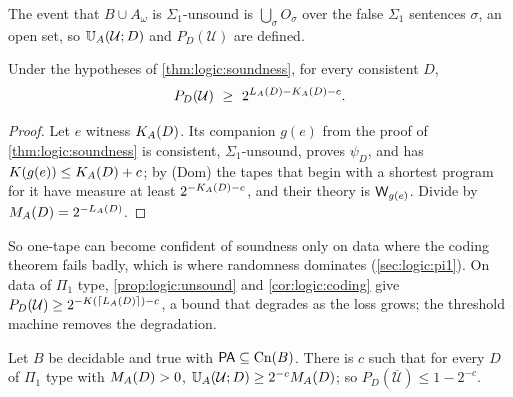 The event that $B\cup A_\omega$ is $\Sigma_1$-unsound is $\bigcup_\sigma O_\sigma$ over the false $\Sigma_1$ sentences $\sigma$, an open set, so $\mathbb{U}_{A}(\mathcal U;D)$ and $P_D(\mathcal U)$ are defined.

\begin{proposition}\label{prop:logic:unsound}
Under the hypotheses of \cref{thm:logic:soundness}, for every consistent $D$,
\[
P_D(\mathcal U)\ \ge\ 2^{\LA(D)-\KA(D)-c}.
\]
\end{proposition}

\begin{proof}
Let $e$ witness $K_{A}(D)$. Its companion $g(e)$ from the proof of \cref{thm:logic:soundness} is consistent, $\Sigma_1$-unsound, proves $\psi_D$, and has $K(g(e))\le K_{A}(D)+c$; by (Dom) the tapes that begin with a shortest program for it have measure at least $2^{-K_{A}(D)-c}$, and their theory is $\mathsf{W}_{g(e)}$. Divide by $M_{A}(D)=2^{-L_{A}(D)}$.
\end{proof}

So one-tape \SAIabbr can become confident of soundness only on data where the coding theorem fails badly, which is where randomness dominates (\cref{sec:logic:pi1}). On data of $\Pi_1$ type, \cref{prop:logic:unsound} and \cref{cor:logic:coding} give $P_D(\mathcal U)\ge2^{-K(\lceil L_{A}(D)\rceil)-c}$, a bound that degrades as the loss grows; the threshold machine removes the degradation.

\begin{theorem}\label{thm:logic:soundnessPi1}
Let $B$ be decidable and true with $\mathsf{PA}\subseteq\mathrm{Cn}(B)$. There is $c$ such that for every $D$ of $\Pi_1$ type with $M_{A}(D)>0$, $\mathbb{U}_{A}(\mathcal U;D)\ge2^{-c}M_{A}(D)$; so $P_D(\overline{\mathcal U})\le1-2^{-c}$.
\end{theorem}

